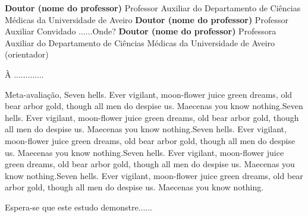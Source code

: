 \TitlePage
  \vspace*{55mm}
       {}
       {\textbf{Doutor (nome do professor)}\newline 
         {\small Professor Auxiliar do Departamento de Ci\^encias M\'edicas da Universidade de Aveiro}
       }
  \vspace*{5mm}
  \TEXT{}
       {\textbf{Doutor (nome do professor)}\newline 
         {\small
        Professor Auxiliar Convidado ......Onde?}
       }
   \vspace*{5mm}
   \TEXT{}
        {\textbf{Doutor (nome do professor)}\newline 
           {\small
           Professora Auxiliar do Departamento de Ci\^encias M\'edicas da Universidade de Aveiro (orientador)}
        }
\EndTitlePage

       




\TitlePage
  \vspace*{55mm}
       {À .............}
\vspace*{10mm}
\EndTitlePage



\TitlePage
  \vspace*{45mm}
  {Meta-avaliação,}
  \vspace{10mm}
       {Seven hells. Ever vigilant, moon-flower juice green dreams, old bear arbor gold, though all men do despise us. Maecenas you know nothing.Seven hells. Ever vigilant, moon-flower juice green dreams, old bear arbor gold, though all men do despise us. Maecenas you know nothing.Seven hells. Ever vigilant, moon-flower juice green dreams,
       	old bear arbor gold, though all men do despise us. Maecenas you know nothing.Seven hells. Ever vigilant, moon-flower juice green dreams, old bear arbor gold, though all men do despise us. Maecenas you know nothing.Seven hells. Ever vigilant, moon-flower juice green dreams, old bear arbor gold, though all men do despise us. Maecenas you know nothing.}
  \TEXT{}
       {}
\vspace*{10mm}
\EndTitlePage


\TitlePage
  \vspace*{40mm}
  \TEXT{}
       {Espera-se que este estudo demonstre......}
  \TEXT{}
       {}
\vspace*{10mm}
\EndTitlePage




